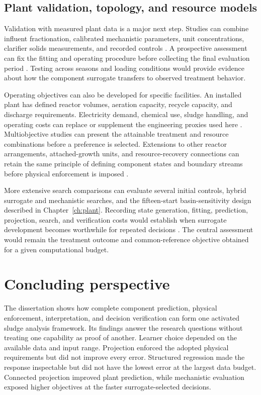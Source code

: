 \subsection{Plant validation, topology, and resource models}

Validation with measured plant data is a major next step. Studies can combine influent fractionation, calibrated mechanistic parameters, unit concentrations, clarifier solids measurements, and recorded controls \citep{Petersen2003,Machado2014,Newhart2019}. A prospective assessment can fix the fitting and operating procedure before collecting the final evaluation period \citep{Kaufman2012}. Testing across seasons and loading conditions would provide evidence about how the component surrogate transfers to observed treatment behavior.

Operating objectives can also be developed for specific facilities. An installed plant has defined reactor volumes, aeration capacity, recycle capacity, and discharge requirements. Electricity demand, chemical use, sludge handling, and operating costs can replace or supplement the engineering proxies used here \citep{Henze2008,Miederer2025}. Multiobjective studies can present the attainable treatment and resource combinations before a preference is selected. Extensions to other reactor arrangements, attached-growth units, and resource-recovery connections can retain the same principle of defining component states and boundary streams before physical enforcement is imposed \citep{Henze2008,Aboagye2021,Durkin2024}.

More extensive search comparisons can evaluate several initial controls, hybrid surrogate and mechanistic searches, and the fifteen-start basin-sensitivity design described in Chapter~\ref{ch:plant}. Recording state generation, fitting, prediction, projection, search, and verification costs would establish when surrogate development becomes worthwhile for repeated decisions \citep{BhosekarIerapetritou2018,Bliek2023}. The central assessment would remain the treatment outcome and common-reference objective obtained for a given computational budget.

\section{Concluding perspective}

The dissertation shows how complete component prediction, physical enforcement, interpretation, and decision verification can form one activated sludge analysis framework. Its findings answer the research questions without treating one capability as proof of another. Learner choice depended on the available data and input range. Projection enforced the adopted physical requirements but did not improve every error. Structured regression made the response inspectable but did not have the lowest error at the largest data budget. Connected projection improved plant prediction, while mechanistic evaluation exposed higher objectives at the faster surrogate-selected decisions.

